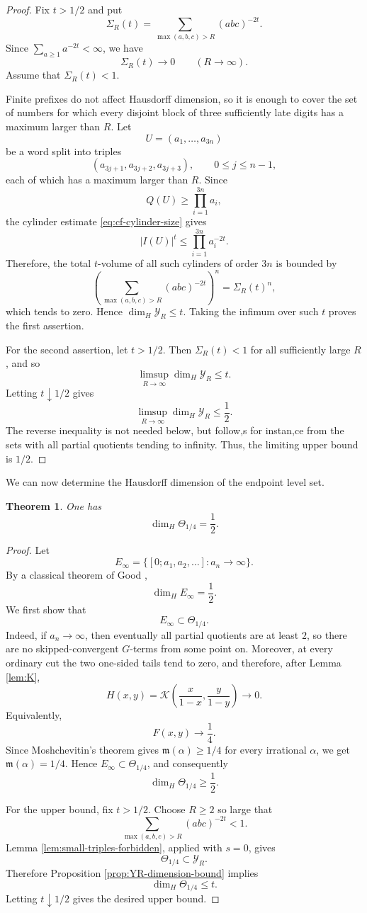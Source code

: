 \documentclass[11pt]{amsart}
\newtheorem{theorem}{Theorem}[section]
\newcommand{\Kfun}{\mathcal K}
\begin{document}
\begin{proof}
Fix $t>1/2$ and put
$$
\Sigma_R(t)
=
\sum_{\max(a,b,c)>R}(abc)^{-2t}.
$$
Since $\sum_{a\ge1}a^{-2t}<\infty$, we have
$$
\Sigma_R(t)\to0
\qquad (R\to\infty).
$$
Assume that $\Sigma_R(t)<1$.

Finite prefixes do not affect Hausdorff dimension, so it is enough to cover the set of numbers for which every disjoint block of three sufficiently late digits has a maximum larger than $R$.  Let
$$
U=(a_1,\ldots,a_{3n})
$$
be a word split into triples
$$
(a_{3j+1},a_{3j+2},a_{3j+3}),
\qquad 0\le j\le n-1,
$$
each of which has a maximum larger than $R$.  Since
$$
Q(U)\ge \prod_{i=1}^{3n}a_i,
$$
the cylinder estimate \eqref{eq:cf-cylinder-size} gives
$$
|I(U)|^t
\le
\prod_{i=1}^{3n} a_i^{-2t}.
$$
Therefore, the total $t$-volume of all such cylinders of order $3n$ is bounded by
$$
\left(
\sum_{\max(a,b,c)>R}(abc)^{-2t}
\right)^n
=
\Sigma_R(t)^n,
$$
which tends to zero.  Hence $\dim_H\mathcal Y_R\le t$.  Taking the infimum over
such $t$ proves the first assertion.

For the second assertion, let $t>1/2$.  Then $\Sigma_R(t)<1$ for all sufficiently
large $R$, and so
$$
\limsup_{R\to\infty}\dim_H\mathcal Y_R\le t.
$$
Letting $t\downarrow1/2$ gives
$$
\limsup_{R\to\infty}\dim_H\mathcal Y_R\le\frac12.
$$
The reverse inequality is not needed below, but follow,s for instan,ce from the sets with all partial quotients tending to infinity.  Thus, the limiting upper bound is $1/2$.
\end{proof}

We can now determine the Hausdorff dimension of the endpoint level set.

\begin{theorem}\label{thm:endpoint-quarter}
One has
$$
\dim_H\Theta_{1/4}=\frac12.
$$
\end{theorem}

\begin{proof}
Let
$$
E_\infty=\{[0;a_1,a_2,\ldots]:a_n\to\infty\}.
$$
By a classical theorem of Good \cite{Good1941},
$$
\dim_H E_\infty=\frac12.
$$
We first show that
$$
E_\infty\subset\Theta_{1/4}.
$$
Indeed, if $a_n\to\infty$, then eventually all partial quotients are at least $2$, so there are no skipped-convergent $G$-terms from some point on.  Moreover, at every ordinary cut the two one-sided tails tend to zero, and therefore, after Lemma \ref{lem:K},
$$
H(x,y)=\Kfun\left(\frac{x}{1-x},\frac{y}{1-y}\right)\to0.
$$
Equivalently,
$$
F(x,y)\to\frac14.
$$
Since Moshchevitin's theorem gives $\mathfrak m(\alpha)\ge1/4$ for every irrational $\alpha$, we get $\mathfrak m(\alpha)=1/4$.  Hence
$E_\infty\subset\Theta_{1/4}$, and consequently
$$
\dim_H\Theta_{1/4}\ge\frac12.
$$

For the upper bound, fix $t>1/2$.  Choose $R\ge2$ so large that
$$
\sum_{\max(a,b,c)>R}(abc)^{-2t}<1.
$$
Lemma \ref{lem:small-triples-forbidden}, applied with $s=0$, gives
$$
\Theta_{1/4}\subset \mathcal Y_R.
$$
Therefore Proposition \ref{prop:YR-dimension-bound} implies
$$
\dim_H\Theta_{1/4}\le t.
$$
Letting $t\downarrow1/2$ gives the desired upper bound.
\end{proof}
\end{document}
